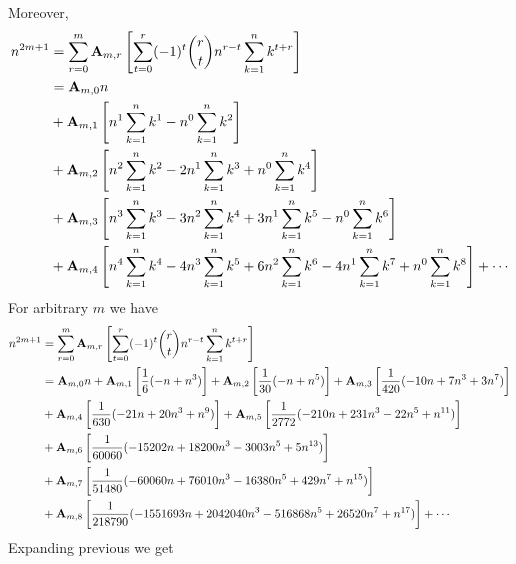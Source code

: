 Moreover,
\begin{equation}
    \begin{split}
        n^{2m+1}
        &= \sum_{r=0}^{m} {\mathbf{A}} \sb{m,r} \left[ \sum_{t=0}^{r} (-1)^t \binom{r}{t} n^{r-t} \sum_{k=1}^{n} k^{t+r} \right] \\
        &= {\mathbf{A}} \sb{m,0} n \\
        &+ {\mathbf{A}} \sb{m,1} \left[ n^{1} \sum_{k=1}^{n} k^{1} - n^{0} \sum_{k=1}^{n} k^{2} \right] \\
        &+ {\mathbf{A}} \sb{m,2} \left[ n^{2} \sum_{k=1}^{n} k^{2} - 2 n^{1} \sum_{k=1}^{n} k^{3} + n^{0} \sum_{k=1}^{n} k^{4}\right] \\
        &+ {\mathbf{A}} \sb{m,3} \left[ n^{3} \sum_{k=1}^{n} k^{3} - 3 n^{2} \sum_{k=1}^{n} k^{4} + 3 n^{1} \sum_{k=1}^{n} k^{5} - n^{0} \sum_{k=1}^{n} k^{6} \right] \\
        &+ {\mathbf{A}} \sb{m,4} \left[ n^{4} \sum_{k=1}^{n} k^{4} - 4 n^{3} \sum_{k=1}^{n} k^{5} + 6 n^{2} \sum_{k=1}^{n} k^{6} - 4 n^{1} \sum_{k=1}^{n} k^{7} + n^{0} \sum_{k=1}^{n} k^{8} \right] + \cdots \\
    \end{split}\label{eq:equation14}
\end{equation}
For arbitrary $m$ we have
\begin{equation}
    \begin{split}
        n^{2m+1}
        &= \sum_{r=0}^{m} {\mathbf{A}} \sb{m,r} \left[ \sum_{t=0}^{r} (-1)^t \binom{r}{t} n^{r-t} \sum_{k=1}^{n} k^{t+r} \right] \\
        &= {\mathbf{A}} \sb{m,0} n
        + {\mathbf{A}} \sb{m,1} \left[ \frac{1}{6} (-n + n^3) \right]
        + {\mathbf{A}} \sb{m,2} \left[ \frac{1}{30} (-n + n^5) \right]
        + {\mathbf{A}} \sb{m,3} \left[ \frac{1}{420} (-10 n + 7 n^3 + 3 n^7) \right] \\
        &+ {\mathbf{A}} \sb{m,4} \left[ \frac{1}{630} (-21 n + 20 n^3 + n^9) \right]
        + {\mathbf{A}} \sb{m,5} \left[ \frac{1}{2772} (-210 n + 231 n^3 - 22 n^5 + n^{11}) \right] \\
        &+ {\mathbf{A}} \sb{m,6} \left[ \frac{1}{60060} (-15202 n + 18200 n^3 - 3003 n^5 + 5 n^{13}) \right] \\
        &+ {\mathbf{A}} \sb{m,7} \left[ \frac{1}{51480} (-60060 n + 76010 n^3 - 16380 n^5 + 429 n^7 + n^{15}) \right] \\
        &+ {\mathbf{A}} \sb{m,8} \left[ \frac{1}{218790} (-1551693 n + 2042040 n^3 - 516868 n^5 + 26520 n^7 + n^{17}) \right] + \cdots
    \end{split}\label{eq:equation17}
\end{equation}
Expanding previous we get

